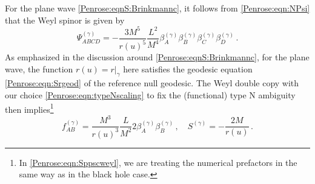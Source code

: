 For the plane wave \eqref{Penrose:eqnS:Brinkmannc}, it follows from \eqref{Penrose:eqn:NPsi} that the Weyl spinor is given by
\begin{equation}\label{Penrose:eqn:Sgammapsidc}
\Psi^{(\gamma)}_{ABCD} = -\frac{3 M^5}{r(u)^5}  \frac{L^2}{M^4}  \beta^{(\gamma)}_A \beta^{(\gamma)}_B  \beta^{(\gamma)}_C  \beta^{(\gamma)}_D   \, .
\end{equation}
As emphasized in the discussion around \eqref{Penrose:eqnS:Brinkmannc}, for the plane wave, the function $r(u) = r|_\gamma$ here satisfies the geodesic equation \eqref{Penrose:eqn:Srgeod} of the reference null geodesic. The Weyl double copy with our choice  \eqref{Penrose:eqn:typeNscaling} to fix the (functional) type N ambiguity then implies\footnote{In \eqref{Penrose:eqn:Sppscweyl}, we are treating the numerical prefactors in the same way as in the black hole case.}
\begin{equation}\label{Penrose:eqn:Sppscweyl}
f^{(\gamma)}_{AB} =   \frac{M^3}{r(u)^3}  \frac{L}{M^2} 2 \beta^{(\gamma)}_A \beta^{(\gamma)}_B  \, , \quad S^{(\gamma)} = -\frac{2M}{r(u)} \, . 
\end{equation}

